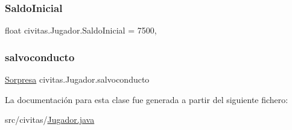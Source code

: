 \mbox{\label{classcivitas_1_1Jugador_ae890734fd30e96b1fb670afa076b99dd}} 
\subsubsection{\texorpdfstring{Saldo\+Inicial}{SaldoInicial}}
{\footnotesize\ttfamily float civitas.\+Jugador.\+Saldo\+Inicial = 7500\hspace{0.3cm}{\ttfamily [static]}, {\ttfamily [private]}}

\mbox{\label{classcivitas_1_1Jugador_ad5cc928f36c930703bec36ee0be85132}} 
\subsubsection{\texorpdfstring{salvoconducto}{salvoconducto}}
{\footnotesize\ttfamily \hyperlink{classcivitas_1_1Sorpresa}{Sorpresa} civitas.\+Jugador.\+salvoconducto\hspace{0.3cm}{\ttfamily [private]}}



La documentación para esta clase fue generada a partir del siguiente fichero\+:\begin{DoxyCompactItemize}
\item 
src/civitas/\hyperlink{Jugador_8java}{Jugador.\+java}\end{DoxyCompactItemize}
